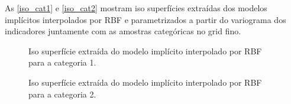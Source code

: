 As \autoref{iso_cat1} e \autoref{iso_cat2} mostram iso superfícies extraídas dos modelos implícitos interpolados por RBF e parametrizados a partir do variograma dos indicadores juntamente com as amostras categóricas no grid fino. 

\begin{figure} 
    \caption{Iso superfície extraída do modelo implícito interpolado por RBF para a categoria 1.} \label{iso_cat1}
     \centering
\end{figure}

\begin{figure} 
    \caption{Iso superfície extraída do modelo implícito interpolado por RBF para a categoria 2.} \label{iso_cat2}
     \centering
\end{figure}


